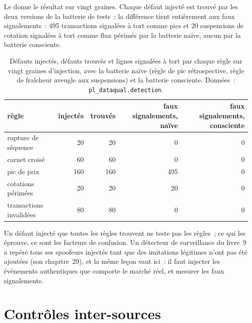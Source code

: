 \label{lst:pl:data-quality-and-lineage:stale}

Le  donne le résultat sur vingt graines. Chaque défaut injecté est trouvé par les deux versions de
la batterie de tests~; la différence tient entièrement aux faux signalements~: 495 transactions signalées à tort comme pics et 20 suspensions de cotation signalées à tort comme
flux périmés par la batterie naïve, aucun par la batterie consciente.

\begin{table}[ht]
\centering\small
\begin{tabular}{lrrrr}
\toprule
règle & injectés & trouvés & faux signalements, naïve & faux signalements, consciente \\
\midrule
rupture de séquence & 20 & 20 & 0 & 0 \\
carnet croisé & 60 & 60 & 0 & 0 \\
pic de prix & 160 & 160 & 495 & 0 \\
cotations périmées & 20 & 20 & 20 & 0 \\
transactions invalidées & 80 & 80 & 0 & 0 \\
\bottomrule
\end{tabular}
\caption{Défauts injectés, défauts trouvés et lignes signalées à tort par chaque règle sur vingt graines d'injection, avec la batterie naïve
(règle de pic rétrospective, règle de fraîcheur aveugle aux suspensions) et la batterie consciente. Données~: \texttt{pl\_dataqual.detection}.}\label{tab:pl:data-quality-and-lineage:detection}
\end{table}

Un défaut injecté que toutes les règles trouvent ne teste pas les règles~; ce qui les éprouve, ce sont les facteurs de confusion. Un détecteur de
surveillance du livre~9 a repéré tous ses spoofeurs injectés tant que des imitations légitimes n'ont pas été ajoutées (son chapitre~29), et la même leçon vaut ici~:
il faut injecter les événements authentiques que comporte le marché réel, et mesurer les faux signalements.

\section{Contrôles inter-sources}

